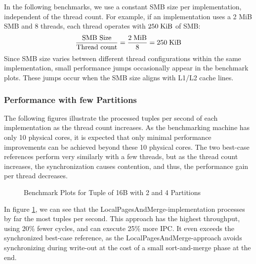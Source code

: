 In the following benchmarks, we use a constant \ac{SMB} size per implementation, independent of the thread count.
For example, if an implementation uses a 2 MiB \ac{SMB} and 8 threads, each thread operates with $250 \textrm{\;KiB}$ of \ac{SMB}:
\begin{equation}
  \frac{\textrm{SMB Size}} {\textrm{Thread count}} = \frac{2 \textrm{\;MiB}}{8} = 250 \textrm{\;KiB}
\end{equation}
Since \ac{SMB} size varies between different thread configurations within the same implementation, small performance jumps occasionally appear in the benchmark plots.
These jumps occur when the \ac{SMB} size aligns with L1/L2 cache lines.

\subsubsection{Performance with few Partitions}
The following figures illustrate the processed tuples per second of each implementation as the thread count increases.
As the benchmarking machine has only 10 physical cores, it is expected that only minimal performance improvements can be achieved beyond these 10 physical cores.
The two best-case references perform very similarly with a few threads, but as the thread count increases, the synchronization causes contention, and thus, the performance gain per thread decreases.

\begin{figure}[h]
  \centering
  \begin{subfigure}{.49\textwidth}
    \centering
    \resizebox{\linewidth}{!}{}
  \end{subfigure}
  \begin{subfigure}{.49\textwidth}
    \centering
    \resizebox{\linewidth}{!}{}
  \end{subfigure}
  \begin{subfigure}{\textwidth}
    \centering
    \resizebox{\linewidth}{!}{}
  \end{subfigure}
  \caption[Shuffle Benchmark Plots for Tuple of 16B with 2 and 4 Partitions]{Benchmark Plots for Tuple of 16B with 2 and 4 Partitions}
  \label{plot-shuffle-16B-2-4}
\end{figure}
In figure \ref{plot-shuffle-16B-2-4}, we can see that the LocalPagesAndMerge-implementation processes by far the most tuples per second.
This approach has the highest throughput, using 20\% fewer cycles, and can execute 25\% more \ac{IPC}.
It even exceeds the synchronized best-case reference, as the LocalPagesAndMerge-approach avoids synchronizing during write-out at the cost of a small sort-and-merge phase at the end.

